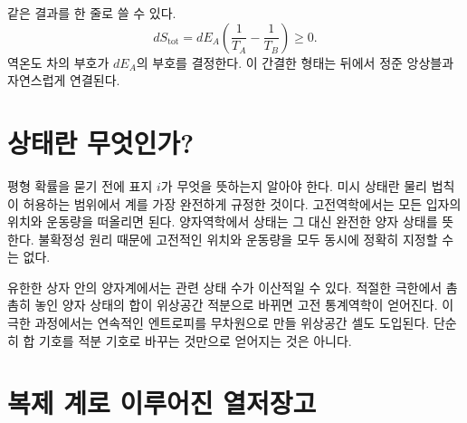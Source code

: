 같은 결과를 한 줄로 쓸 수 있다.
\begin{equation}
 dS_{\mathrm{tot}}
 =dE_A\left(\frac{1}{T_A}-\frac{1}{T_B}\right)\geq0.
 \label{eq:sm3-compact-flow}
\end{equation}역온도 차의 부호가 \(dE_A\)의 부호를 결정한다. 이 간결한 형태는 뒤에서 정준 앙상블과 자연스럽게 연결된다.

\begin{classroomqa}\end{classroomqa}

\section{상태란 무엇인가?}

평형 확률을 묻기 전에 표지 \(i\)가 무엇을 뜻하는지 알아야 한다. 미시 상태란 물리 법칙이 허용하는 범위에서 계를 가장 완전하게 규정한 것이다. 고전역학에서는 모든 입자의 위치와 운동량을 떠올리면 된다. 양자역학에서 상태는 그 대신 완전한 양자 상태를 뜻한다. 불확정성 원리 때문에 고전적인 위치와 운동량을 모두 동시에 정확히 지정할 수는 없다.

유한한 상자 안의 양자계에서는 관련 상태 수가 이산적일 수 있다. 적절한 극한에서 촘촘히 놓인 양자 상태의 합이 위상공간 적분으로 바뀌면 고전 통계역학이 얻어진다. 이 극한 과정에서는 연속적인 엔트로피를 무차원으로 만들 위상공간 셀도 도입된다. 단순히 합 기호를 적분 기호로 바꾸는 것만으로 얻어지는 것은 아니다.

\begin{classroomqa}\end{classroomqa}

\section{복제 계로 이루어진 열저장고}

